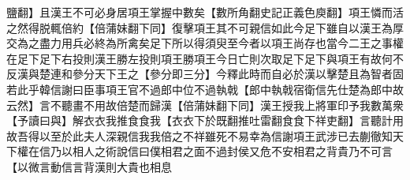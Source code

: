 鹽翻】且漢王不可必身居項王掌握中數矣【數所角翻史記正義色庾翻】項王憐而活之然得脱輒倍約【倍蒲妹翻下同】復擊項王其不可親信如此今足下雖自以漢王為厚交為之盡力用兵必終為所禽矣足下所以得須臾至今者以項王尚存也當今二王之事權在足下足下右投則漢王勝左投則項王勝項王今日亡則次取足下足下與項王有故何不反漢與楚連和參分天下王之【參分即三分】今釋此時而自必於漢以擊楚且為智者固若此乎韓信謝曰臣事項王官不過郎中位不過執戟【郎中執戟宿衛信先仕楚為郎中故云然】言不聽畫不用故倍楚而歸漢【倍蒲妹翻下同】漢王授我上將軍印予我數萬衆【予讀曰與】解衣衣我推食食我【衣衣下於既翻推吐雷翻食食下祥吏翻】言聽計用故吾得以至於此夫人深親信我我倍之不祥雖死不易幸為信謝項王武涉已去蒯徹知天下權在信乃以相人之術說信曰僕相君之面不過封侯又危不安相君之背貴乃不可言【以微言動信言背漢則大貴也相息